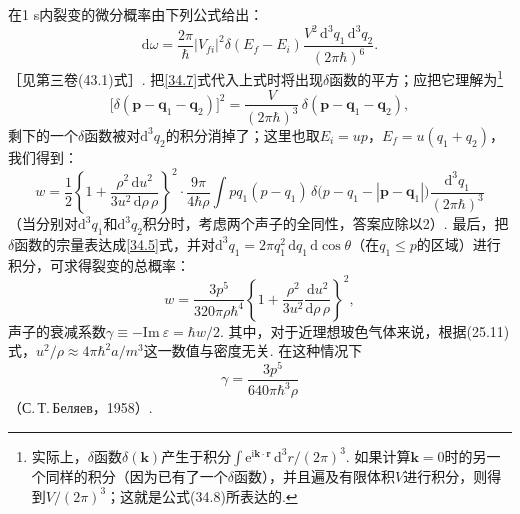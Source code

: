 在1 s内裂变的微分概率由下列公式给出：
\begin{equation*}
\mathrm{d}\omega=\frac{2\pi}{\hbar}|V_{fi}|^{2}\delta(E_{f}-E_{i})
\frac{V^{2}\,\mathrm{d}^{3}q_{1}\,\mathrm{d}^{3}q_{2}}{(2\pi\hbar)^{6}}.
\end{equation*}
［见第三卷(43.1)式］. 把\eqref{34.7}式代入上式时将出现$\delta$函数的平方；应把它理解为\footnote{实际上，$\delta$函数$\delta(\bm{k})$产生于积分$\int\mathrm{e}^{\mathrm{i}\bm{k}\cdot\bm{r}}\,\mathrm{d}^{3}r/(2\pi)^{3}$. 如果计算$\bm{k}=0$时的另一个同样的积分（因为已有了一个$\delta$函数），并且遍及有限体积$V$进行积分，则得到$V/(2\pi)^{3}$；这就是公式(34.8)所表达的.}
\begin{equation}
\big[\delta(\bm{p}-\bm{q}_{1}-\bm{q}_{2})\big]^{2}
=\frac{V}{(2\pi\hbar)^{3}}\,\delta(\bm{p}-\bm{q}_{1}-\bm{q}_{2}),
\label{34.8}
\end{equation}
剩下的一个$\delta$函数被对$\mathrm{d}^{3}q_{2}$的积分消掉了；这里也取$E_{i}=up$，$E_{f}=u(q_{1}+q_{2})$，我们得到：
\begin{equation*}
w=\frac{1}{2}\left\{1+\frac{\rho^{2}\,\mathrm{d}u^{2}}{3u^{2}\,\mathrm{d}\rho\,\rho}\right\}^{2}
\cdot\frac{9\pi}{4\hbar\rho}\int pq_{1}(p-q_{1})\,
\delta\big(p-q_{1}-|\bm{p}-\bm{q}_{1}|\big)
\frac{\mathrm{d}^{3}q_{1}}{(2\pi\hbar)^{3}}
\end{equation*}
（当分别对$\mathrm{d}^{3}q_{1}$和$\mathrm{d}^{3}q_{2}$积分时，考虑两个声子的全同性，答案应除以2）. 最后，把$\delta$函数的宗量表达成\eqref{34.5}式，并对$\mathrm{d}^{3}q_{1}=2\pi q_{1}^{2}\,\mathrm{d}q_{1}\,\mathrm{d}\cos\theta$（在$q_{1}\leqslant p$的区域）进行积分，可求得裂变的总概率：
\begin{equation}
w=\frac{3p^{5}}{320\pi\rho\hbar^{4}}
\left\{1+\frac{\rho^{2}}{3u^{2}}\frac{\mathrm{d}u^{2}}{\mathrm{d}\rho\,\rho}\right\}^{2},
\label{34.9}
\end{equation}
声子的衰减系数$\gamma\equiv-\mathrm{Im}\ \varepsilon=\hbar w/2$. 其中，对于近理想玻色气体来说，根据(25.11)式，$u^{2}/\rho\approx4\pi\hbar^{2}a/m^{3}$这一数值与密度无关. 在这种情况下
\begin{equation}
\gamma=\frac{3p^{5}}{640\pi\hbar^{3}\rho}
\label{34.10}
\end{equation}
（С.\,Т.\,Беляев，1958）.

